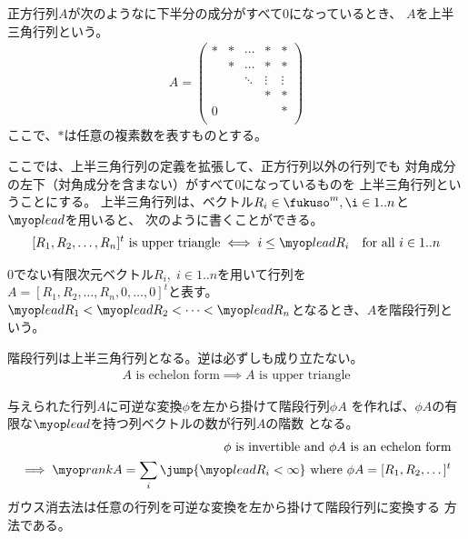 	\begin{definition}[上半三角行列]\label{def:上半三角行列} %
		正方行列$A$が次のようなに下半分の成分がすべて$0$になっているとき、
		$A$を上半三角行列という。
		\begin{equation*}\begin{split} %
			A = \begin{pmatrix}
			* & * & \cdots & * & * \\
			& * & \cdots & * & * \\
			& & \ddots & \vdots & \vdots \\
			& & & * & * \\
			0 & & & & * \\
			\end{pmatrix}
		\end{split}\end{equation*} %
		ここで、$*$は任意の複素数を表すものとする。
	\end{definition} %

	ここでは、上半三角行列の定義を拡張して、正方行列以外の行列でも
	対角成分の左下（対角成分を含まない）がすべて$0$になっているものを
	上半三角行列ということにする。
	上半三角行列は、ベクトル$R_i\in\fukuso^m,\i\in1..n$と$\lead$を用いると、
	次のように書くことができる。
	\begin{equation*}\begin{split} %
		[R_1,R_2,\dots,R_n]^t \text{ is upper triangle}
		\iff i\le\lead R_i \quad\text{for all }i\in1..n
	\end{split}\end{equation*} %

	\begin{definition}\label{def:階段行列} %
		$0$でない有限次元ベクトル$R_i,\;i\in1..n$を用いて行列を
		$A=[R_1,R_2,\dots,R_n,0,\dots,0]^t$と表す。
		$\lead R_1<\lead R_2<\cdots< \lead R_n$となるとき、$A$を階段行列という。
	\end{definition} %

	階段行列は上半三角行列となる。逆は必ずしも成り立たない。
	\begin{equation*}\begin{split} %
		A \text{ is echelon form} \implies A \text{ is upper triangle}
	\end{split}\end{equation*} %

	与えられた行列$A$に可逆な変換$\phi$を左から掛けて階段行列$\phi A$
	を作れば、$\phi A$の有限な$\lead$を持つ列ベクトルの数が行列$A$の階数
	となる。
	\begin{equation*}\begin{split} %
		\phi \text{ is invertible and } \phi A \text{ is an echelon form} \\
		\implies \rank A = \sum_{i}\jump{\lead R_i<\infty}
		\text{ where } \phi A = [R_1,R_2,\dots]^t \\
	\end{split}\end{equation*} %
	ガウス消去法は任意の行列を可逆な変換を左から掛けて階段行列に変換する
	方法である。


